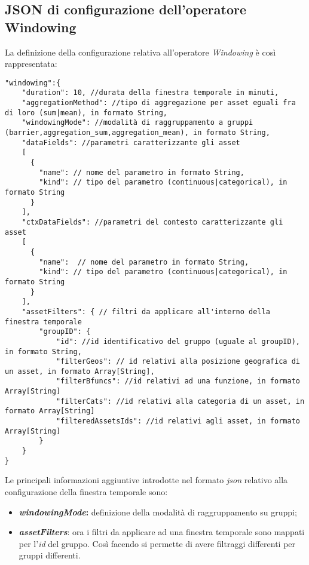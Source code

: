 \subsection{JSON di configurazione dell'operatore Windowing}\label{sec:json-windowing}
La definizione della configurazione relativa all'operatore \textit{Windowing} è così rappresentata:

\begin{verbatim}
"windowing":{
    "duration": 10, //durata della finestra temporale in minuti,
    "aggregationMethod": //tipo di aggregazione per asset eguali fra di loro (sum|mean), in formato String,
    "windowingMode": //modalità di raggruppamento a gruppi (barrier,aggregation_sum,aggregation_mean), in formato String,
    "dataFields": //parametri caratterizzante gli asset
    [
      {
        "name": // nome del parametro in formato String,
        "kind": // tipo del parametro (continuous|categorical), in formato String
      }
    ],
    "ctxDataFields": //parametri del contesto caratterizzante gli asset 
    [
      {
        "name":  // nome del parametro in formato String,
        "kind": // tipo del parametro (continuous|categorical), in formato String
      }
    ],
    "assetFilters": { // filtri da applicare all'interno della finestra temporale
        "groupID": {
            "id": //id identificativo del gruppo (uguale al groupID), in formato String,
            "filterGeos": // id relativi alla posizione geografica di un asset, in formato Array[String],
            "filterBfuncs": //id relativi ad una funzione, in formato Array[String]
            "filterCats": //id relativi alla categoria di un asset, in formato Array[String]
            "filteredAssetsIds": //id relativi agli asset, in formato Array[String]
        } 
    }
}
\end{verbatim}
Le principali informazioni aggiuntive introdotte nel formato \textit{\gls{json}} relativo alla configurazione della finestra temporale sono:
\begin{itemize}
	\item{\textbf{\textit{windowingMode}:} definizione della modalità di raggruppamento su gruppi;}
	\item{\textbf{\textit{assetFilters}}: ora i filtri da applicare ad una finestra temporale sono mappati per l'\textit{id} del gruppo. Così facendo si permette di avere filtraggi differenti per gruppi differenti.}
\end{itemize} 


